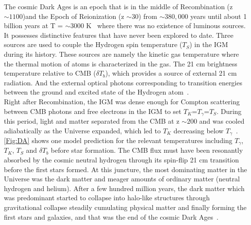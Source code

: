 \documentclass[12pt,a4paper]{report}
\begin{document}
	The cosmic Dark Ages is an epoch that is in the middle of Recombination (z $\sim1100$)and the Epoch of Reionization (z $\sim30$) from $\sim 380,000$ years until about 1 billion years at T = $\sim3000$ K~\citep{2014arXiv1412.2096J} where there was no existence of luminous sources.  It possesses distinctive features that have never been explored to date. Three sources are used to couple the Hydrogen spin temperature ($T_S$) in the IGM during its history. These sources are namely the kinetic gas temperature where the thermal motion of atoms is characterized in the gas. The 21 cm brightness temperature relative to CMB ($\delta$$T_b$), which provides a source of external 21 cm radiation. And the external optical photons corresponding to transition energies between the ground and excited state of the Hydrogen atom~\citep{2015aska.confE...1K,2006PhR...433..181F}.\\
	
	Right after Recombination, the IGM was dense enough for Compton scattering between CMB photons and free electrons in the IGM to set $T_K$=$T_\gamma$=$T_S$. During this period, light and matter separated from the CMB at z $\sim200$ and was cooled adiabatically as the Universe expanded, which led to $T_K$ decreasing below $T_\gamma$~\citep{2006PhR...433..181F}. \autoref{Fig:DA} shows one model prediction for the relevant temperatures including $T_\gamma$, $T_K$, $T_S$ and $\delta$$T_b$ before star formation. The CMB flux must have been resonantly absorbed by the cosmic neutral hydrogen through its spin-flip 21 cm transition before the first stars formed. At this juncture, the most dominating matter in the Universe was the dark matter and meager amounts of ordinary matter (neutral hydrogen and helium). After a few hundred million years, the dark matter which was predominant started to collapse into halo-like structures through gravitational collapse steadily cumulating physical matter and finally forming the first stars and galaxies, and that was the end of the cosmic Dark Ages~\citep{2003Sci...300.1904M}.
\end{document}
